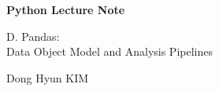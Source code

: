 \documentclass[a4paper,11pt]{article}
\begin{document}

\begin{titlepage}
    \centering
    \vspace*{\fill}

    {\Huge\bfseries Python Lecture Note\par}

    \vspace{1cm}

    {\Large D. Pandas:\\Data Object Model and Analysis Pipelines\par}

    \vspace{0.5cm}

    {\large Dong Hyun KIM\par}

    \vspace*{\fill}
\end{titlepage}



\end{document}
